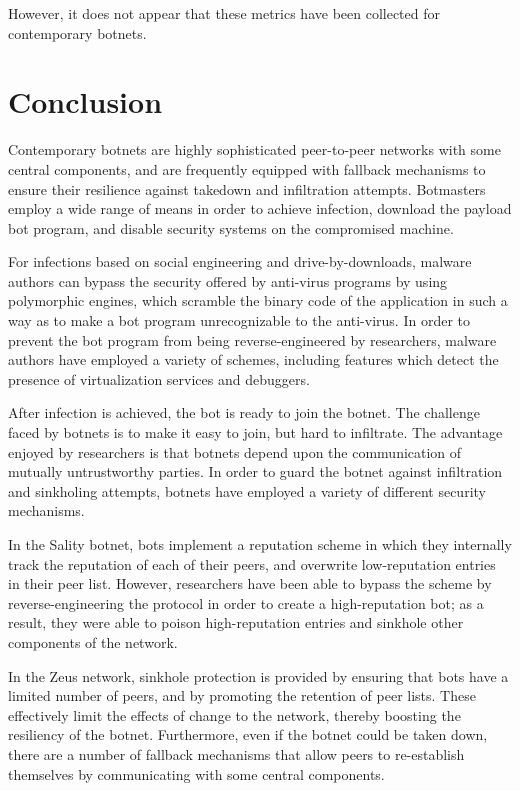 \documentclass{acm_proc_article-sp}
\begin{document}
However, it does not appear that these metrics have been collected for contemporary botnets.

\section{Conclusion}

Contemporary botnets are highly sophisticated peer-to-peer networks with some central components, and are frequently equipped with fallback mechanisms to ensure their resilience against takedown and infiltration attempts.  Botmasters employ a wide range of means in order to achieve infection, download the payload bot program, and disable security systems on the compromised machine.

For infections based on social engineering and drive-by-downloads, malware authors can bypass the security offered by anti-virus programs by using polymorphic engines, which scramble the binary code of the application in such a way as to make a bot program unrecognizable to the anti-virus.  In order to prevent the bot program from being reverse-engineered by researchers, malware authors have employed a variety of schemes, including features which detect the presence of virtualization services and debuggers.

After infection is achieved, the bot is ready to join the botnet.  The challenge faced by botnets is to make it easy to join, but hard to infiltrate.  The advantage enjoyed by researchers is that botnets depend upon the communication of mutually untrustworthy parties\cite{stone:p2p}. In order to guard the botnet against infiltration and sinkholing attempts, botnets have employed a variety of different security mechanisms. 

In the Sality botnet, bots implement a reputation scheme in which they internally track the reputation of each of their peers, and overwrite low-reputation entries in their peer list.  However, researchers have been able to bypass the scheme by reverse-engineering the protocol in order to create a high-reputation bot; as a result, they were able to poison high-reputation entries and sinkhole other components of the network.

In the Zeus network, sinkhole protection is provided by ensuring that bots have a limited number of peers, and by promoting the retention of peer lists.  These effectively limit the effects of change to the network, thereby boosting the resiliency of the botnet.  Furthermore, even if the botnet could be taken down, there are a number of fallback mechanisms that allow peers to re-establish themselves by communicating with some central components.
\end{document}
